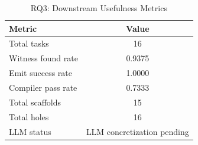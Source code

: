 \begin{table}[t]
\centering
\caption{RQ3: Downstream Usefulness Metrics}
\label{tab:rq3}
\begin{tabular}{lc}
\toprule
Metric & Value \\
\midrule
Total tasks & 16 \\
Witness found rate & 0.9375 \\
Emit success rate & 1.0000 \\
Compiler pass rate & 0.7333 \\
Total scaffolds & 15 \\
Total holes & 16 \\
LLM status & LLM concretization pending \\
\bottomrule
\end{tabular}
\end{table}